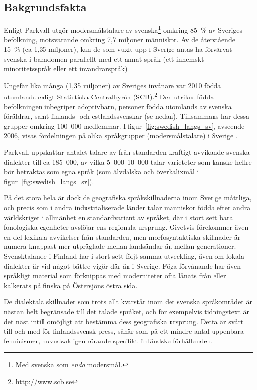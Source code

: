 \begin{multicols}{2}

\subsection{Bakgrundsfakta}
Enligt Parkvall \cite{parkvall2009} utgör modersmålstalare av
svenska\footnote{Med svenska som \textit{enda} modersmål.} omkring
85~\% av Sveriges befolkning, motsvarande omkring 7,7 miljoner
människor. Av de återstående 15~\% (ca 1,35 miljoner), kan de som
vuxit upp i Sverige antas ha förvärvat svenska i barndomen parallellt
med ett annat språk (ett inhemskt minoritetsspråk eller ett
invandrarspråk).



Ungefär lika många (1,35 miljoner) av Sveriges invånare var 2010 födda
utomlands enligt Statistiska Centralbyrån
(SCB).\footnote{http://www.scb.se} Den utrikes födda befolkningen
inbegriper adoptivbarn, personer födda utomlands av svenska föräldrar,
samt finlands- och estlands­svenskar (se nedan). Tillsammans har dessa
grupper omkring 100~000 medlemmar.  I
figur~\ref{fig:swedish_langs_sv}, avseende 2006, visas fördelningen
på olika språkgrupper (modersmålstalare) i Sverige
\cite{parkvall2009}.

Parkvall \cite{parkvall2009} uppskattar antalet talare av från
standarden kraftigt avvikande svenska dialekter till ca 185~000, av
vilka 5~000--10~000 talar varieteter som kanske hellre bör betraktas
som egna språk (som älvdalska och överkalixmål i
figur~\ref{fig:swedish_langs_sv}).

På det stora hela är dock de geografiska språkskillnaderna inom
Sverige måttliga, och precis som i andra industrialiserade länder
talar människor födda efter andra världskriget i allmänhet en
standardvariant av språket, där i stort sett bara fonologiska
egenheter avslöjar ens regionala ursprung. Givetvis förekommer även en
del lexikala avvikelser från standarden, men morfosyntaktiska
skillnader är numera knappast mer utpräglade mellan landsändar än
mellan generationer. Svensktalande i Finland har i stort sett följt
samma utveckling, även om lokala dialekter är vid något bättre vigör
där än i Sverige. Föga förvånande har även språkligt material som
förknippas med moderniteter ofta lånats från eller kalkerats på finska
på Östersjöns östra sida.

De dialektala skillnader som trots allt kvarstår inom det svenska
språkområdet är nästan helt begränsade till det talade språket, och
för exempelvis tidningstext är det näst intill omöjligt att bestämma
dess geografiska ursprung. Detta är svårt till och med för
finlandssvensk press, sånär som på ett mindre antal uppenbara
fennicismer, huvudsakligen rörande specifikt finländska förhållanden.



\end{multicols}
